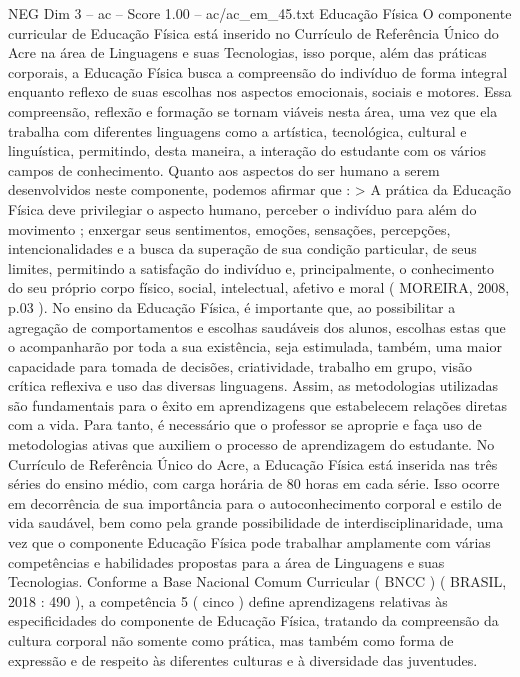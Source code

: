 \begin{textsample}{NEG Dim 3 – ac – Score 1.00 – ac/ac\_em\_45.txt}  \label{ex:f3_neg_266}
Educação Física O componente curricular de Educação Física está inserido no Currículo de Referência Único do Acre na área de Linguagens e suas Tecnologias, isso porque, além das práticas corporais, a Educação Física busca a compreensão do indivíduo de forma integral enquanto reflexo de suas escolhas nos aspectos emocionais, sociais e motores.
Essa compreensão, reflexão e formação se tornam viáveis nesta área, uma vez que ela trabalha com diferentes linguagens como a artística, tecnológica, cultural e linguística, permitindo, desta maneira, a interação do estudante com os vários campos de conhecimento.
Quanto aos aspectos do ser humano a serem desenvolvidos neste componente, podemos afirmar que : > A prática da Educação Física deve privilegiar o aspecto humano, perceber o indivíduo para além do movimento ; enxergar seus sentimentos, emoções, sensações, percepções, intencionalidades e a busca da superação de sua condição particular, de seus limites, permitindo a satisfação do indivíduo e, principalmente, o conhecimento do seu próprio corpo físico, social, intelectual, afetivo e moral ( MOREIRA, 2008, p.03 ).
No ensino da Educação Física, é importante que, ao possibilitar a agregação de comportamentos e escolhas saudáveis dos alunos, escolhas estas que o acompanharão por toda a sua existência, seja estimulada, também, uma maior capacidade para tomada de decisões, criatividade, trabalho em grupo, visão crítica reflexiva e uso das diversas linguagens.
Assim, as metodologias utilizadas são fundamentais para o êxito em aprendizagens que estabelecem relações diretas com a vida.
Para tanto, é necessário que o professor se aproprie e faça uso de metodologias ativas que auxiliem o processo de aprendizagem do estudante.
No Currículo de Referência Único do Acre, a Educação Física está inserida nas três séries do ensino médio, com carga horária de 80 horas em cada série.
Isso ocorre em decorrência de sua importância para o autoconhecimento corporal e estilo de vida saudável, bem como pela grande possibilidade de interdisciplinaridade, uma vez que o componente Educação Física pode trabalhar amplamente com várias competências e habilidades propostas para a área de Linguagens e suas Tecnologias.
Conforme a Base Nacional Comum Curricular ( BNCC ) ( BRASIL, 2018 : 490 ), a competência 5 ( cinco ) define aprendizagens relativas às especificidades do componente de Educação Física, tratando da compreensão da cultura corporal não somente como prática, mas também como forma de expressão e de respeito às diferentes culturas e à diversidade das juventudes.

\end{textsample}
